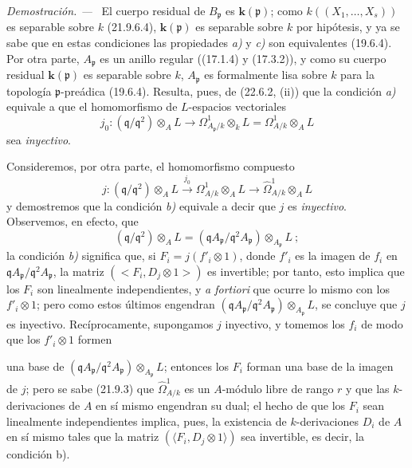 \documentclass[10pt,oneside]{book}
\newcommand{\oldpage}[2][]{%
  \setcounter{footnote}{0}%
  \marginpar{\scriptsize\textbf{#1}~|~#2}\ignorespaces}
\newenvironment{proof}{%
  \par\medskip\noindent\textit{Demostración. ---\ }}{\par}
\begin{document}
\begin{proof}
El cuerpo residual de $B_{\mathfrak p}$ es $\boldsymbol{k}(\mathfrak p)$; como
$k((X_1,\ldots,X_s))$ es separable sobre $k$ (21.9.6.4), $\boldsymbol k(\mathfrak p)$ es
separable sobre $k$ por hipótesis, y ya se sabe que en estas condiciones las
propiedades \emph{a)} y \emph{c)} son equivalentes (19.6.4). Por otra parte,
$A_{\mathfrak p}$ es un anillo regular ((17.1.4) y (17.3.2)), y como su
cuerpo residual $\boldsymbol{k}(\mathfrak p)$ es separable sobre $k$, $A_{\mathfrak p}$ es
formalmente lisa sobre $k$ para la topología $\mathfrak p$-preádica
(19.6.4). Resulta, pues, de (22.6.2, (ii)) que la condición \emph{a)} equivale a que
el homomorfismo de $L$-espacios vectoriales
\begin{equation}
\label{0.22.7.2.1-es}
  j_0:(\mathfrak q/\mathfrak q^2)\otimes_AL
  \longrightarrow\Omega^1_{A_{\mathfrak p}/k}\otimes_kL
  =\Omega^1_{A/k}\otimes_AL
  \tag{22.7.2.1}
\end{equation}
sea \emph{inyectivo}.

Consideremos, por otra parte, el homomorfismo compuesto
\begin{equation}
\label{0.22.7.2.2-es}
  j:(\mathfrak q/\mathfrak q^2)\otimes_AL
  \xrightarrow{j_0}\Omega^1_{A/k}\otimes_AL
  \longrightarrow\widehat\Omega^1_{A/k}\otimes_AL
  \tag{22.7.2.2}
\end{equation}
y demostremos que la condición \emph{b)} equivale a decir que $j$ es \emph{inyectivo}. Observemos, en
efecto, que
\[
  (\mathfrak q/\mathfrak q^2)\otimes_AL
  =(\mathfrak qA_{\mathfrak p}/\mathfrak q^2A_{\mathfrak p})
  \otimes_{A_{\mathfrak p}}L~;
\]
la condición \emph{b)} significa que, si $F_i=j(f'_i\otimes1)$, donde $f'_i$ es la imagen
de $f_i$ en
$\mathfrak qA_{\mathfrak p}/\mathfrak q^2A_{\mathfrak p}$, la matriz
$(\mathopen{<}F_i,D_j\otimes1\mathclose{>})$ es invertible; por tanto, esto implica que los
$F_i$ son linealmente independientes, y \emph{a fortiori} que ocurre lo
mismo con los $f'_i\otimes1$; pero como estos últimos engendran
$(\mathfrak qA_{\mathfrak p}/\mathfrak q^2A_{\mathfrak p})
\otimes_{A_{\mathfrak p}}L$, se concluye que $j$ es inyectivo. Recíprocamente,
supongamos $j$ inyectivo, y tomemos los $f_i$ de modo que los $f'_i\otimes1$
formen

\oldpage[0\textsubscript{IV-1}]{210}

una base de
$(\mathfrak qA_{\mathfrak p}/\mathfrak q^2A_{\mathfrak p})
\otimes_{A_{\mathfrak p}}L$; entonces los $F_i$ forman una base de la imagen de
$j$; pero se sabe (21.9.3) que $\widehat\Omega^1_{A/k}$ es un $A$-módulo
libre de rango $r$ y que las $k$-derivaciones de $A$ en sí mismo engendran su
dual; el hecho de que los $F_i$ sean linealmente independientes implica, pues,
la existencia de $k$-derivaciones $D_i$ de $A$ en sí mismo tales que la matriz
$(\langle F_i,D_j\otimes1\rangle)$ sea invertible, es decir, la condición
b).


\end{proof}
\end{document}
